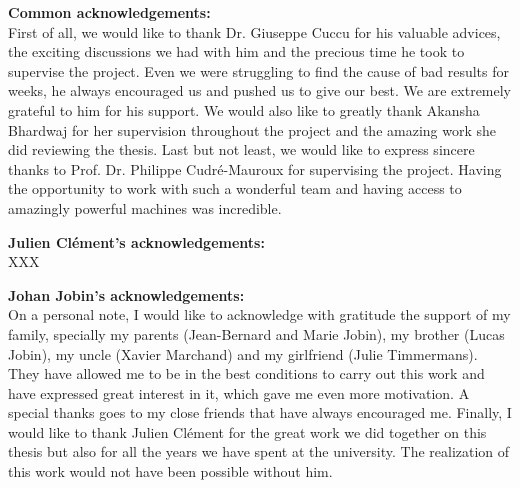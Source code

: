 
\textbf{Common acknowledgements:}\\
First of all, we would like to thank Dr. Giuseppe Cuccu for his valuable advices, the exciting discussions we had with him and the precious time he took to supervise the project. Even we were struggling to find the cause of bad results for weeks, he always encouraged us and pushed us to give our best. We are extremely grateful to him for his support. We would also like to greatly thank Akansha Bhardwaj for her supervision throughout the project and the amazing work she did reviewing the thesis. Last but not least, we would like to express sincere thanks to Prof. Dr. Philippe Cudré-Mauroux for supervising the project. Having the opportunity to work with such a wonderful team and having access to amazingly powerful machines was incredible.

\noindent \textbf{Julien Clément's acknowledgements:}\\
XXX

\noindent \textbf{Johan Jobin's acknowledgements:}\\
On a personal note, I would like to acknowledge with gratitude the support of my family, specially my parents (Jean-Bernard and Marie Jobin), my brother (Lucas Jobin), my uncle (Xavier Marchand) and my girlfriend (Julie Timmermans). They have allowed me to be in the best conditions to carry out this work and have expressed great interest in it, which gave me even more motivation. A special thanks goes to my close friends that have always encouraged me. Finally, I would like to thank Julien Clément for the great work we did together on this thesis but also for all the years we have spent at the university. The realization of this work would not have been possible without him.